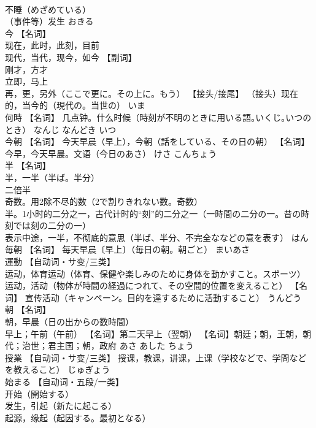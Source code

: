 \documentclass[8pt]{extreport}
\begin{document}
\begin{CJK}{UTF8}{min}
\\	不睡（めざめている） 
\\	（事件等）发生	おきる	
\\	今	【名词】 
\\	现在，此时，此刻，目前 
\\	现代，当代，现今，如今 【副词】 
\\	刚才，方才 
\\	立即，马上 
\\	再，更，另外（ここで更に。その上に。もう） 【接头/接尾】 （接头）现在的，当今的（現代の。当世の）	いま	
\\	何時	【名词】 几点钟。什么时候（時刻が不明のときに用いる語｡いくじ｡いつのとき）	なんじ なんどき いつ	
\\	今朝	【名词】 今天早晨（早上），今朝（話をしている、その日の朝） 【名词】 今早，今天早晨。文语（今日のあさ）	けさ こんちょう	
\\	半	【名词】 
\\	半，一半（半ば。半分） 
\\	二倍半 
\\	奇数。用2除不尽的数（2で割りきれない数。奇数） 
\\	半。1小时的二分之一，古代计时的“刻”的二分之一（一時間の二分の一。昔の時刻では刻の二分の一） 
\\	表示中途，一半，不彻底的意思（半ば、半分、不完全ななどの意を表す）	はん	
\\	毎朝	【名词】 每天早晨〔早上〕（毎日の朝。朝ごと）	まいあさ	
\\	運動	【自动词・サ变/三类】 
\\	运动，体育运动（体育、保健や楽しみのために身体を動かすこと。スポーツ） 
\\	运动，活动（物体が時間の経過につれて、その空間的位置を変えること） 【名词】 宣传活动（キャンペーン。目的を達するために活動すること）	うんどう	
\\	朝	【名词】 
\\	朝，早晨（日の出からの数時間） 
\\	早上；午前（午前） 【名词】第二天早上（翌朝） 【名词】朝廷；朝，王朝，朝代；治世；君主国；朝，政府	あさ あした ちょう	
\\	授業	【自动词・サ变/三类】 授课，教课，讲课，上课（学校などで、学問などを教えること）	じゅぎょう	
\\	始まる	【自动词・五段/一类】 
\\	开始（開始する） 
\\	发生，引起（新たに起こる） 
\\	起源，缘起（起因する。最初となる） 

\end{CJK}
\end{document}

